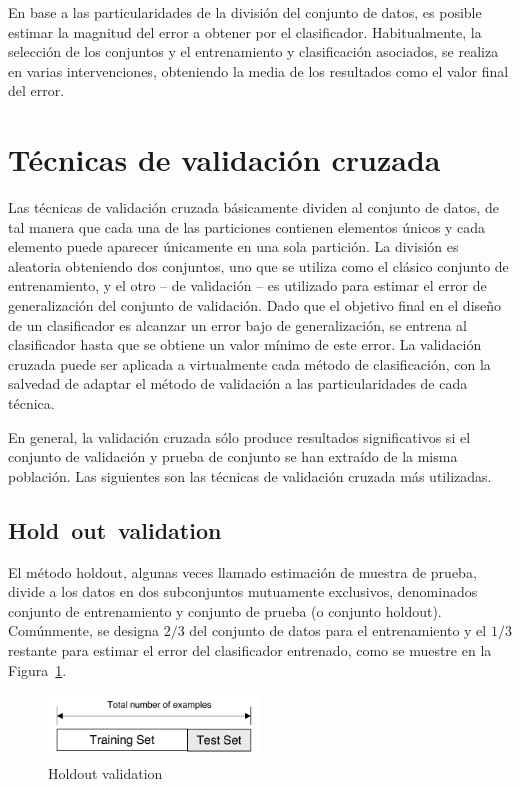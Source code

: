 \documentclass{article}
\begin{document}
En base a las particularidades de la división del conjunto de datos, es posible estimar la magnitud del error a obtener por el clasificador.
Habitualmente, la selección de los conjuntos y el entrenamiento y clasificación asociados, se realiza en varias intervenciones, obteniendo la media de los resultados como el valor final del error.


\section{Técnicas de validación cruzada}
Las técnicas de validación cruzada básicamente dividen al conjunto de datos, de tal manera que cada una de las particiones contienen elementos únicos y cada elemento puede aparecer únicamente en una sola partición.
La división es aleatoria obteniendo dos conjuntos, uno que se utiliza como el clásico conjunto de entrenamiento, y el otro -- de validación -- es utilizado para estimar el error de generalización del conjunto de validación.
Dado que el objetivo final en el diseño de un clasificador es alcanzar un error bajo de generalización, se entrena al clasificador hasta que se obtiene un valor mínimo de este error.
La validación cruzada puede ser aplicada a virtualmente cada método de clasificación, con la salvedad de adaptar el método de validación a las particularidades de cada técnica.


En general, la validación cruzada sólo produce resultados significativos si el conjunto de validación y prueba de conjunto se han extraído de la misma población.
Las siguientes son las técnicas de validación cruzada más utilizadas.


\subsection{Hold out validation}
El método holdout, algunas veces llamado estimación de muestra de prueba, divide a los datos en dos subconjuntos mutuamente exclusivos, denominados conjunto de entrenamiento y conjunto de prueba (o conjunto holdout).
Comúnmente, se designa $2/3$ del conjunto de datos para el entrenamiento y el $1/3$ restante para estimar el error del clasificador entrenado, como se muestre en la Figura~\ref{fig:holdout-validation}.
\begin{figure}
	\centering
	\includegraphics[width=0.5\textwidth]{resources/images/holdout}
	\caption{Holdout validation}
	\label{fig:holdout-validation}
\end{figure}
\end{document}
